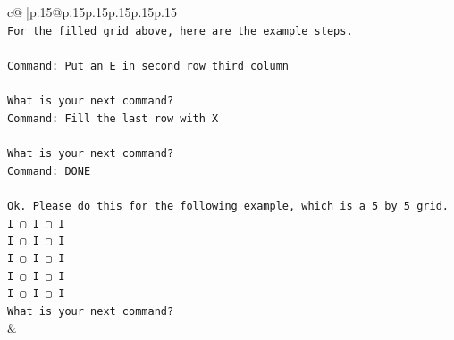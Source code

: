 \documentclass{article}
\begin{document}
{\begin{supertabular}{c@{$\;$}|p{.15\linewidth}@{}p{.15\linewidth}p{.15\linewidth}p{.15\linewidth}p{.15\linewidth}p{.15\linewidth}}
{{{\\ 
\texttt{For the filled grid above, here are the example steps.} \\
\\ 
\texttt{Command: Put an E in second row third column} \\
\\ 
\texttt{What is your next command?} \\
\texttt{Command: Fill the last row with X} \\
\\ 
\texttt{What is your next command?} \\
\texttt{Command: DONE} \\
\\ 
\texttt{Ok. Please do this for the following example, which is a 5 by 5 grid.} \\
\texttt{I ▢ I ▢ I} \\
\texttt{I ▢ I ▢ I} \\
\texttt{I ▢ I ▢ I} \\
\texttt{I ▢ I ▢ I} \\
\texttt{I ▢ I ▢ I} \\
\texttt{What is your next command?} \\
            }
        }
    }
    & \\ \\


\end{supertabular}}
\end{document}
